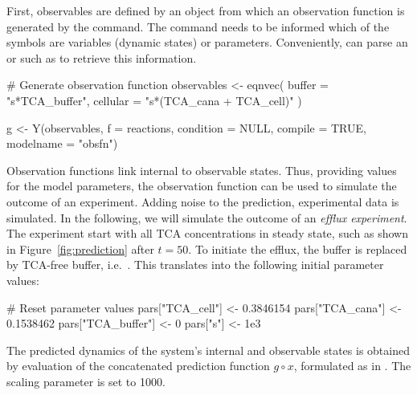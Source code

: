 \documentclass[article]{jss}
\begin{document}
First, observables are defined by an  object from which an observation function  is generated by the  command. The  command needs to be informed which of the symbols are variables (dynamic states) or parameters. Conveniently,  can parse an  or  such as  to retrieve this information.
\begin{CodeChunk}
\begin{CodeInput}
# Generate observation function
observables <- eqnvec(
  buffer = "s*TCA_buffer",
  cellular = "s*(TCA_cana + TCA_cell)"
)

g <- Y(observables, f = reactions, condition = NULL,
       compile = TRUE, modelname = "obsfn")

\end{CodeInput}
\end{CodeChunk}
Observation functions link internal to observable states. Thus, providing values for the model parameters, the observation function can be used to simulate the outcome of an experiment. Adding noise to the prediction, experimental data is simulated.
In the following, we will simulate the outcome of an \textit{efflux experiment}.
The experiment start with all TCA concentrations in steady state, such as shown in Figure~\ref{fig:prediction} after $t = 50$. To initiate the efflux, the buffer is replaced by TCA-free buffer, i.e.~. This translates into the following initial parameter values:
\begin{CodeChunk}
\begin{CodeInput}
# Reset parameter values
pars["TCA_cell"] <- 0.3846154
pars["TCA_cana"] <- 0.1538462
pars["TCA_buffer"] <- 0
pars["s"] <- 1e3
\end{CodeInput}
\end{CodeChunk}
The predicted dynamics of the system's internal and observable states is obtained by evaluation of the concatenated prediction function $g\circ x$, formulated as  in . The scaling parameter  is set to 1000.
\end{document}
